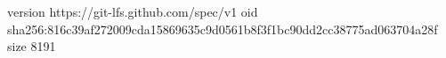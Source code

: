version https://git-lfs.github.com/spec/v1
oid sha256:816c39af272009cda15869635c9d0561b8f3f1bc90dd2cc38775ad063704a28f
size 8191
